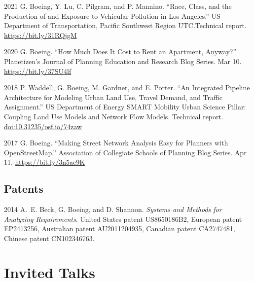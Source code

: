 \documentclass[12pt,letterpaper]{report}
\begin{document}
    \begin{tablist}

        \item[2021] \tab{}G. Boeing, Y. Lu, C. Pilgram, and P. Mannino. \enquote{Race, Class, and the Production of and Exposure to Vehicular Pollution in Los Angeles.} US Department of Transportation, Pacific Southwest Region UTC.\@ Technical report. \href{https://bit.ly/31RQjgM}{https://bit.ly/31RQjgM}

        \item[2020] \tab{}G. Boeing. \enquote{How Much Does It Cost to Rent an Apartment, Anyway?} Planetizen's Journal of Planning Education and Research Blog Series. Mar 10. \href{https://bit.ly/37SU4lf}{https://bit.ly/37SU4lf}

        \item[2018] \tab{}P. Waddell, G. Boeing, M. Gardner, and E. Porter. \enquote{An Integrated Pipeline Architecture for Modeling Urban Land Use, Travel Demand, and Traffic Assignment.} US Department of Energy SMART Mobility Urban Science Pillar: Coupling Land Use Models and Network Flow Models. Technical report. \href{https://doi.org/10.31235/osf.io/74zaw}{doi:10.31235/osf.io/74zaw}

        \item[2017] \tab{}G. Boeing. \enquote{Making Street Network Analysis Easy for Planners with OpenStreetMap.} Association of Collegiate Schools of Planning Blog Series. Apr 11. \href{https://bit.ly/3n5ac9K}{https://bit.ly/3n5ac9K}

    \end{tablist}



    \subsection*{Patents}

    \begin{tablist}

        \item[2014] \tab{}A.~E. Beck, G. Boeing, and D. Shannon. \textit{Systems and Methods for Analyzing Requirements}. United States patent US8650186B2, European patent EP2413256, Australian patent AU2011204935, Canadian patent CA2747481, Chinese patent CN102346763.


    \end{tablist}



    \section*{Invited Talks}
\end{document}
